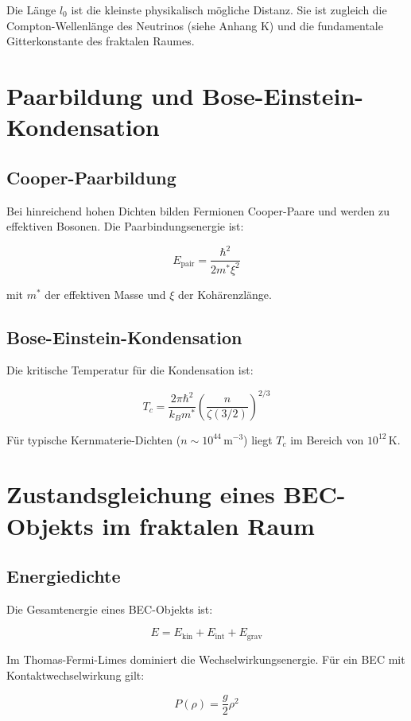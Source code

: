 Die Länge \( l_0 \) ist die kleinste physikalisch mögliche Distanz. 
Sie ist zugleich die Compton-Wellenlänge des Neutrinos 
(siehe Anhang K) und die fundamentale Gitterkonstante des fraktalen Raumes.

\section{Paarbildung und Bose-Einstein-Kondensation}

\subsection{Cooper-Paarbildung}

Bei hinreichend hohen Dichten bilden Fermionen Cooper-Paare und werden 
zu effektiven Bosonen. Die Paarbindungsenergie ist:

\[
E_{\text{pair}} = \frac{\hbar^2}{2m^* \xi^2} \tag{L.3}
\]

mit \( m^* \) der effektiven Masse und \( \xi \) der Kohärenzlänge.

\subsection{Bose-Einstein-Kondensation}

Die kritische Temperatur für die Kondensation ist:

\[
T_c = \frac{2\pi \hbar^2}{k_B m^*} \left( \frac{n}{\zeta(3/2)} \right)^{2/3} \tag{L.4}
\]

Für typische Kernmaterie-Dichten (\( n \sim 10^{44} \, \text{m}^{-3} \)) 
liegt \( T_c \) im Bereich von \( 10^{12} \, \text{K} \).

\section{Zustandsgleichung eines BEC-Objekts im fraktalen Raum}

\subsection{Energiedichte}

Die Gesamtenergie eines BEC-Objekts ist:

\[
E = E_{\text{kin}} + E_{\text{int}} + E_{\text{grav}} \tag{L.5}
\]

Im Thomas-Fermi-Limes dominiert die Wechselwirkungsenergie. 
Für ein BEC mit Kontaktwechselwirkung gilt:

\[
P(\rho) = \frac{g}{2} \rho^2 \tag{L.6}
\]

